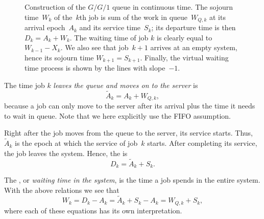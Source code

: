 \begin{figure}[t]
\caption{Construction of the $G/G/1$ queue in continuous time. The
  sojourn time~$W_{k}$ of the~$k$th job is sum of the work in queue~$W_{Q,k}$ at its arrival epoch~$A_k$ and its service time~$S_k$;
  its departure time is then $D_k=A_k + W_k$. The waiting time of job
  $k$ is clearly equal to $W_{k-1}-X_{k}$. We also see that job~$k+1$
  arrives at an empty system, hence its sojourn time
  $W_{k+1}=S_{k+1}$. Finally, the virtual waiting time process is
  shown by the lines with slope~$-1$.}
  \label{fig:waitingtimegg1}
\end{figure}

The time job $k$ \emph{leaves the queue and moves on to the server} is
\begin{equation*}
 \tilde A_k = A_k + W_{Q,k},
\end{equation*}
because a job can only move to the server after its arrival plus the
time it needs to wait in queue.  Note that we here explicitly use the
FIFO assumption.

Right after the job moves from the queue to the server, its service starts.  Thus,~$\tilde A_{k}$ is the epoch at which the service of job~$k$ starts. After completing its service,
the job leaves the system. Hence, the  is
\begin{equation*}
  D_k = \tilde A_{k} + S_k.
\end{equation*}

The , or \emph{waiting time in the system}, is the
time a job spends in the entire system. With the above relations we
see that
\begin{equation}
  W_k = D_k - A_k = \tilde A_{k} + S_k -A_k = W_{Q,k} + S_k,
\end{equation}
where each of these equations has its own interpretation. 


